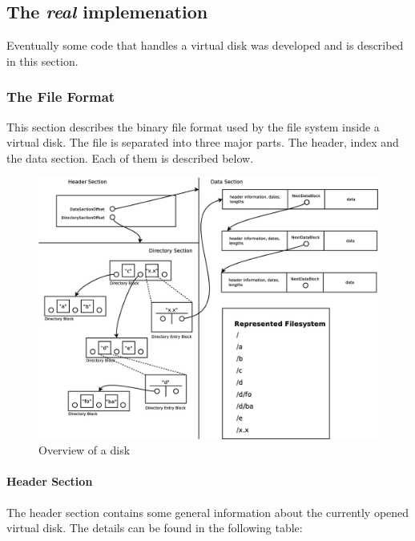 \subsection{The \emph{real} implemenation}

Eventually some code that handles a virtual disk was developed and is described
in this section.

\subsubsection{The File Format}


This section describes the binary file format used by the file system inside a
virtual disk.
The file is separated into three major parts. The header, index and the data
section. Each of them is described below.

\begin{figure}[h!]
\centering
\includegraphics[width=1\textwidth]{figures/fileFormat.eps}
\caption{Overview of a disk}
\label{fig:disk_overview}
\end{figure}

\paragraph{Header Section} The header section contains some general information
about the currently opened virtual disk. The details can be found in the
following table:

